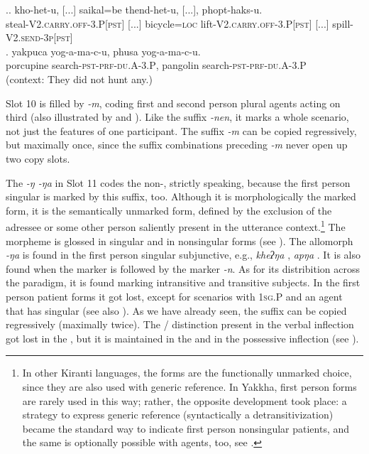 \ex.\ag. kho-het-u, [...] saikal=be thend-het-u, [...],  phopt-haks-u.\\
steal{\scshape -V2.carry.off-3.P[pst]}  [...] bicycle{\scshape =loc} lift{\scshape -V2.carry.off-3.P[pst]} [...] spill{\scshape -V2.send-3p[pst]}\\
  
\bg. yakpuca   yog-a-ma-c-u, phusa    yog-a-ma-c-u.\\
porcupine   search{\scshape -pst-prf-du.A-3.P}, pangolin   search{\scshape -pst-prf-du.A-3.P}\\
 (context: They did not hunt any.) 
	
Slot  10 is filled by \emph{-m}, coding first and second person plural agents  acting on third  (also illustrated by \LLast[a] and \LLast[c]). Like the suffix \emph{-nen}, it marks a whole scenario, not just the features of one participant. The suffix \emph{-m} can be copied regressively, but maximally once, since the suffix combinations preceding \emph{-m} never open up two copy slots.
	
	
The   \emph{-ŋ \ti -ŋa} in Slot 11 codes the non-,  strictly speaking, because the first person singular is marked by this suffix, too. Although it is morphologically the  marked form,  it is the semantically unmarked form, defined by the exclusion of the adressee or some other person saliently present in the utterance context.\footnote{In other Kiranti languages, the  forms are the functionally unmarked choice, since they are also used with generic reference. In Yakkha, first person forms are rarely used in this way; rather, the opposite development took place: a strategy to express generic reference (syntactically a detransitivization) became the standard way to indicate first person nonsingular patients, and the same is optionally possible with agents, too, see .} The morpheme is glossed  in singular and   in nonsingular forms (see \Next). The allomorph \emph{-ŋa} is found in the first person singular subjunctive, e.g., \emph{kheʔŋa} , \emph{apŋa} . It is also found when the  marker is followed by the  marker \emph{-n}. As for its distribition across the paradigm, it is found marking intransitive and transitive subjects. In the first person patient forms it got lost, except for scenarios with {\scshape 1sg.P}  and an agent that has singular   (see also ). As we have already seen, the  suffix can be copied regressively (maximally twice). The / distinction present in the verbal inflection got lost in the , but it is maintained in the  and in the possessive inflection (see ). 
\largerpage

